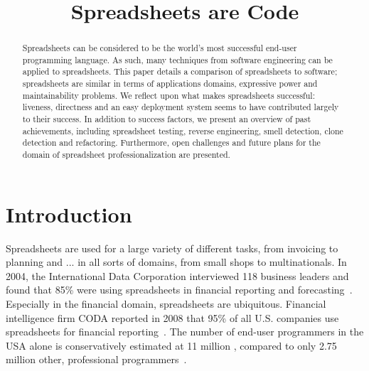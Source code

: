 \documentclass[conference]{IEEEtran}
\begin{document}
\title{Spreadsheets are Code}

\author{
}


\maketitle

\begin{abstract}
Spreadsheets can be considered to be the world's most successful end-user programming language. As such, many techniques from software engineering can be applied to spreadsheets. This paper details a comparison of spreadsheets to software; spreadsheets are similar in terms of applications domains, expressive power and maintainability problems. We reflect upon what makes spreadsheets successful: liveness, directness  and an easy deployment system seems to have contributed largely to their success. In addition to success factors, we present an overview of past achievements, including spreadsheet testing, reverse engineering, smell detection, clone detection and refactoring. Furthermore, open challenges and future plans for the domain of spreadsheet professionalization are presented.
\end{abstract}

\IEEEpeerreviewmaketitle

\section{Introduction}
Spreadsheets are used for a large variety of different tasks, from invoicing to planning and ...  in all sorts of domains, from small shops to multinationals. In 2004, the International Data Corporation interviewed 118 business leaders and found that 85\% were using spreadsheets in financial reporting and forecasting~\cite{Panko2008}. Especially in the financial domain, spreadsheets are ubiquitous. Financial intelligence firm CODA reported in 2008 that 95\% of all U.S. companies use spreadsheets for financial reporting~\cite{Panko2008}. The number of end-user programmers in the USA alone is conservatively estimated at 11 million , compared to only 2.75 million other, professional programmers~\cite{Scaf2005}. 
\end{document}
